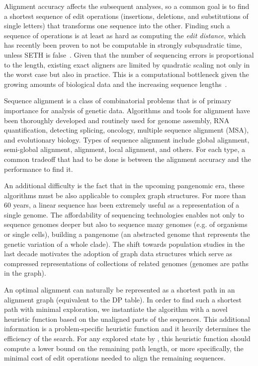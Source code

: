 Alignment accuracy affects the subsequent analyses, so a common goal
is to find a shortest sequence of edit operations (insertions, deletions, and
substitutions of single letters) that transforms one sequence into the other.
Finding such a sequence of operations is at least as hard as computing the \emph{edit
distance}, which has recently been proven to not be computable in strongly
subquadratic time, unless SETH is false~\citep{backurs2015edit}. Given that
the number of sequencing errors is proportional to the length, existing exact aligners are
limited by quadratic scaling not only in the worst case but also in practice.
This is a computational bottleneck given the growing amounts of biological data
and the increasing sequence lengths~\citep{kucherov2019evolution}.

Sequence alignment is a class of combinatorial problems that is of primary
importance for analysis of genetic data. Algorithms and tools for alignment have
been thoroughly developed and routinely used for genome assembly, RNA
quantification, detecting splicing, oncology, multiple sequence alignment (MSA),
and evolutionary biology. Types of sequence alignment include global alignment,
semi-global alignment, alignment, local alignment, and others. For each type, a
common tradeoff that had to be done is between the alignment accuracy and the
performance to find it.

An additional difficulty is the fact that in the
upcoming pangenomic era, these algorithms must be also applicable to complex
graph structures. For more than 60 years, a linear sequence has been extremely
useful as a representation of a single genome. The affordability of sequencing
technologies enables not only to sequence genomes deeper but also to sequence
many genomes (e.g. of organisms or single cells), building a pangenome (an
abstracted genome that represents the genetic variation of a whole clade). The
shift towards population studies in the last decade motivates the adoption of
graph data structures which serve as compressed representations of collections
of related genomes (genomes are paths in the graph).

An optimal alignment can naturally be represented as a shortest path in an
alignment graph (equivalent to the DP table). In order to find such a shortest
path with minimal exploration, we instantiate the \A algorithm with a novel
heuristic function based on the unaligned parts of the sequences. This
additional information is a problem-specific heuristic function and it heavily
determines the efficiency of the search. For any explored state by \A, this
heuristic function should compute a lower bound on the remaining path length, or
more specifically, the minimal cost of edit operations needed to align the
remaining sequences.

